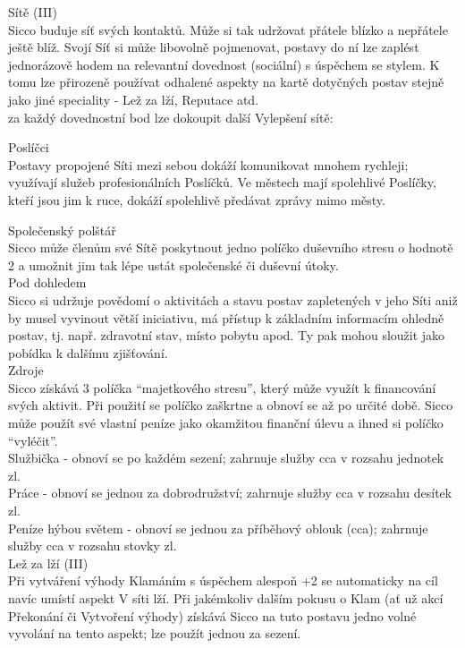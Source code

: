 Sítě (III)\\
Sicco buduje síť svých kontaktů. Může si tak udržovat přátele blízko a nepřátele ještě blíž. Svojí Síť si může libovolně pojmenovat, postavy do ní lze zaplést jednorázově hodem na relevantní dovednost (sociální) s úspěchem se stylem. K tomu lze přirozeně používat odhalené aspekty na kartě dotyčných postav stejně jako jiné speciality - Lež za lží, Reputace atd.\\
za každý dovednostní bod lze dokoupit další Vylepšení sítě:

Poslíčci\\
Postavy propojené Síti mezi sebou dokáží komunikovat mnohem rychleji; využívají služeb profesionálních Poslíčků. Ve městech mají spolehlivé Poslíčky, kteří jsou jim k ruce, dokáží spolehlivě předávat zprávy mimo městy.

Společenský polštář\\
Sicco může členům své Sítě poskytnout jedno políčko duševního stresu o hodnotě 2 a umožnit jim tak lépe ustát společenské či duševní útoky.\\

Pod dohledem\\
Sicco si udržuje povědomí o aktivitách a stavu postav zapletených v jeho Síti
aniž by musel vyvinout větší iniciativu, má přístup k základním informacím ohledně postav, tj. např. zdravotní stav, místo pobytu apod. Ty pak mohou sloužit jako pobídka k dalšímu zjišťování.\\

Zdroje\\
Sicco získává 3 políčka “majetkového stresu”, který může využít k financování svých aktivit. Při použití se políčko zaškrtne a obnoví se až po určité době. Sicco může použít své vlastní peníze jako okamžitou finanční úlevu a ihned si políčko “vyléčit”.\\

Službička - obnoví se po každém sezení; zahrnuje služby cca v rozsahu jednotek zl.\\
Práce - obnoví se jednou za dobrodružství; zahrnuje služby cca v rozsahu desítek zl.\\
Peníze hýbou světem - obnoví se jednou za příběhový oblouk (cca); zahrnuje služby cca v rozsahu stovky zl.\\


Lež za lží (III)\\
Při vytváření výhody Klamáním s úspěchem alespoň +2 se automaticky na cíl navíc umístí aspekt V síti lží. Při jakémkoliv dalším pokusu o Klam (ať už akcí Překonání či Vytvoření výhody) získává Sicco na tuto postavu jedno volné vyvolání na tento aspekt; lze použít jednou za sezení. \\

